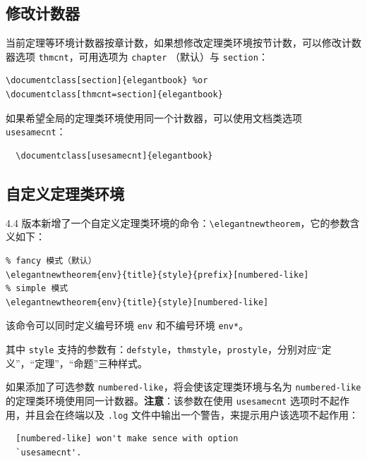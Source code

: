 \documentclass[lang=cn,newtx,10pt,scheme=chinese]{elegantbook}
\begin{document}
\subsection{修改计数器}

当前定理等环境计数器按章计数，如果想修改定理类环境按节计数，可以修改计数器选项 \lstinline{thmcnt}，可用选项为 \lstinline{chapter} （默认）与 \lstinline{section}：

\begin{lstlisting}
\documentclass[section]{elegantbook} %or
\documentclass[thmcnt=section]{elegantbook}
\end{lstlisting}

如果希望全局的定理类环境使用同一个计数器，可以使用文档类选项 \lstinline{usesamecnt}：

\begin{lstlisting}
  \documentclass[usesamecnt]{elegantbook}
\end{lstlisting}

\subsection{自定义定理类环境}

4.4 版本新增了一个自定义定理类环境的命令：\lstinline|\elegantnewtheorem|，它的参数含义如下：

\begin{lstlisting}
% fancy 模式（默认）
\elegantnewtheorem{env}{title}{style}{prefix}[numbered-like]
% simple 模式
\elegantnewtheorem{env}{title}{style}[numbered-like]
\end{lstlisting}
该命令可以同时定义编号环境 \lstinline|env| 和不编号环境 \lstinline|env*|。

其中 \lstinline|style| 支持的参数有：\lstinline|defstyle|，\lstinline|thmstyle|，\lstinline|prostyle|，分别对应“定义”，“定理”，“命题”三种样式。

如果添加了可选参数 \lstinline{numbered-like}，将会使该定理类环境与名为 \lstinline{numbered-like} 的定理类环境使用同一计数器。\textbf{注意}：该参数在使用 \lstinline{usesamecnt} 选项时不起作用，并且会在终端以及 \lstinline{.log} 文件中输出一个警告，来提示用户该选项不起作用：

\begin{lstlisting}
  [numbered-like] won't make sence with option
  `usesamecnt'.
\end{lstlisting}
\end{document}
